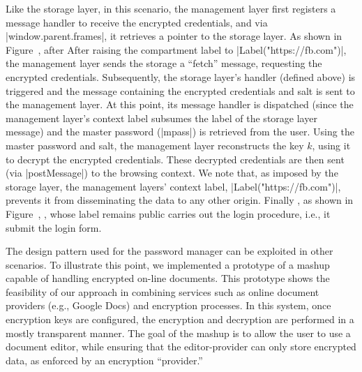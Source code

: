 Like the storage layer, in this scenario, the management layer first
registers a message handler to receive the encrypted credentials, and
via \js|window.parent.frames|, it retrieves a pointer to the storage
layer.
%
\iffigures
\ifcompletefigures
As shown in Figure~, after 
\fi
\else
After
\fi
raising the
compartment label to \js|Label("https://fb.com")|, the management
layer sends the storage a ``fetch'' message, requesting the encrypted
credentials.
%
%
Subsequently, the storage layer's handler (defined above) is triggered
and the message containing the encrypted
credentials and salt is sent to the management layer.
%
At this point, its message handler is dispatched (since the management
layer's context label subsumes the label of the storage layer message)
and the master password (\js|mpass|) is retrieved from the user. 
%
Using the master password and salt, the management layer reconstructs
the key $k$, using it to decrypt the encrypted credentials.
%
These decrypted credentials are then sent (via \js|postMessage|) to
the  browsing context.
%
We note that, as imposed by the storage layer, the management layers'
context label, \js|Label("https://fb.com")|, prevents it from
disseminating the data to any other origin.
%
Finally
\iffigures
\ifcompletefigures
, as shown in Figure~, 
\fi
\fi
{},
whose label remains public carries out the login procedure, i.e., it
submit the login form.

The design pattern used for the password manager can be exploited in other
scenarios. To illustrate this point, we implemented a prototype of a
mashup capable of handling encrypted on-line documents.
This prototype shows the feasibility of our approach in combining
services such as online document providers (e.g., Google Docs)
and encryption processes. In this system, once encryption keys are configured,
the encryption and decryption are performed in a mostly transparent
manner.
The goal of the mashup is to allow the user to use a document editor,
while ensuring that the editor-provider can only store encrypted data,
as enforced by an encryption ``provider.''

